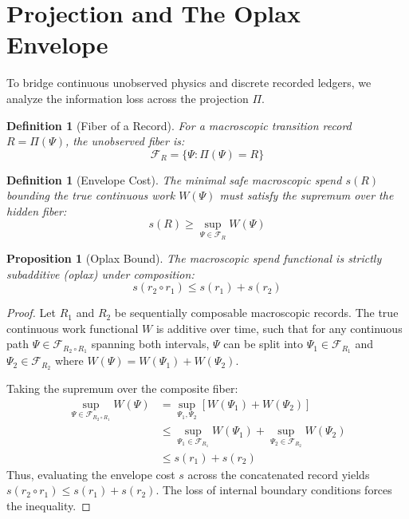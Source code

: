 \documentclass[11pt]{article}
\newtheorem{definition}[theorem]{Definition}
\newtheorem{proposition}[theorem]{Proposition}
\begin{document}
\section{Projection and The Oplax Envelope}

To bridge continuous unobserved physics and discrete recorded ledgers, we analyze the information loss across the projection $\Pi$.

\begin{definition}[Fiber of a Record]
For a macroscopic transition record $R = \Pi(\Psi)$, the unobserved fiber is:
\[
\mathcal{F}_R = \{\Psi : \Pi(\Psi)=R\}
\]
\end{definition}

\begin{definition}[Envelope Cost]
The minimal safe macroscopic spend $s(R)$ bounding the true continuous work $W(\Psi)$ must satisfy the supremum over the hidden fiber:
\[
s(R) \ge \sup_{\Psi \in \mathcal{F}_R} W(\Psi)
\]
\end{definition}

\begin{proposition}[Oplax Bound]
The macroscopic spend functional is strictly subadditive (oplax) under composition:
\[
s(r_2 \circ r_1) \le s(r_1)+s(r_2)
\]
\end{proposition}
\begin{proof}
Let $R_1$ and $R_2$ be sequentially composable macroscopic records. The true continuous work functional $W$ is additive over time, such that for any continuous path $\Psi \in \mathcal{F}_{R_2 \circ R_1}$ spanning both intervals, $\Psi$ can be split into $\Psi_1 \in \mathcal{F}_{R_1}$ and $\Psi_2 \in \mathcal{F}_{R_2}$ where $W(\Psi) = W(\Psi_1) + W(\Psi_2)$. 

Taking the supremum over the composite fiber:
\begin{align*}
\sup_{\Psi \in \mathcal{F}_{R_2 \circ R_1}} W(\Psi) &= \sup_{\Psi_1, \Psi_2} [W(\Psi_1) + W(\Psi_2)] \\
&\le \sup_{\Psi_1 \in \mathcal{F}_{R_1}} W(\Psi_1) + \sup_{\Psi_2 \in \mathcal{F}_{R_2}} W(\Psi_2) \\
&\le s(r_1) + s(r_2)
\end{align*}
Thus, evaluating the envelope cost $s$ across the concatenated record yields $s(r_2 \circ r_1) \le s(r_1) + s(r_2)$. The loss of internal boundary conditions forces the inequality.
\end{proof}

\end{document}
